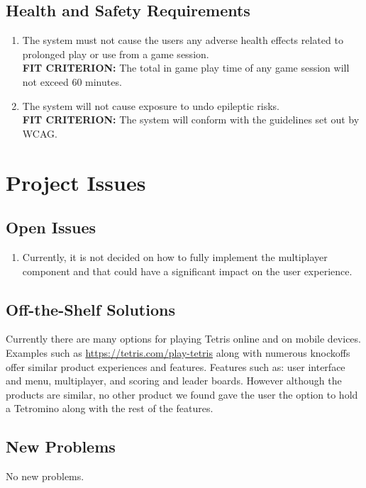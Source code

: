 \documentclass[12pt, titlepage]{article}
\begin{document}
\subsection{Health and Safety Requirements}
\begin{enumerate}[{HSR}1. ]
    \item The system must not cause the users any adverse health effects related to prolonged play or use from a game session.
    \\\textbf{FIT CRITERION:} The total in game play time of any game session will not exceed 60 minutes.
    \item The system will not cause exposure to undo epileptic risks.
    \\\textbf{FIT CRITERION:} The system will conform with the guidelines set out by WCAG. \cite{wcag}
\end{enumerate}
\section{Project Issues}
\subsection{Open Issues}
\begin{enumerate}[{Issue }1.]
\item Currently, it is not decided on how to fully implement the multiplayer component and that could have a significant impact on the user experience. 
\end{enumerate}

\subsection{Off-the-Shelf Solutions}
Currently there are many options for playing Tetris online and on mobile devices. Examples such as \url{https://tetris.com/play-tetris} along with numerous knockoffs offer similar product experiences and features. Features such as: user interface and menu, multiplayer, and scoring and leader boards. However although the products are similar, no other product we found gave the user the option to hold a Tetromino along with the rest of the features.

\subsection{New Problems}
No new problems.
\end{document}
